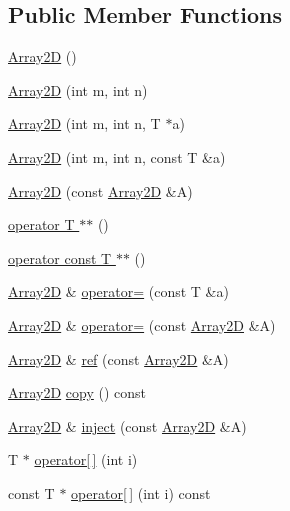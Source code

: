 \subsection*{Public Member Functions}
\begin{DoxyCompactItemize}
\item 
\hyperlink{classTNT_1_1Array2D_ab01d5e4b88c04d9e4906e7ea069f9dc0}{Array2\-D} ()
\item 
\hyperlink{classTNT_1_1Array2D_a80990fd85f6c04956a247d43d23a6af4}{Array2\-D} (int m, int n)
\item 
\hyperlink{classTNT_1_1Array2D_a7447ecfb709ce78db3c78ff21104f6f2}{Array2\-D} (int m, int n, T $\ast$a)
\item 
\hyperlink{classTNT_1_1Array2D_a0bbed4288ef81ee0c9baabf69c824191}{Array2\-D} (int m, int n, const T \&a)
\item 
\hyperlink{classTNT_1_1Array2D_a065e795f6f2486ca7ea0bca09200dbd4}{Array2\-D} (const \hyperlink{classTNT_1_1Array2D}{Array2\-D} \&A)
\item 
\hyperlink{classTNT_1_1Array2D_a4049d0d72eddf918ec9a84f799b92e47}{operator T $\ast$$\ast$} ()
\item 
\hyperlink{classTNT_1_1Array2D_a38bf24494047929cb39c89b5c9c516f7}{operator const T $\ast$$\ast$} ()
\item 
\hyperlink{classTNT_1_1Array2D}{Array2\-D} \& \hyperlink{classTNT_1_1Array2D_af14c53b4b3977ab8ecb34da61e5a6e4c}{operator=} (const T \&a)
\item 
\hyperlink{classTNT_1_1Array2D}{Array2\-D} \& \hyperlink{classTNT_1_1Array2D_a291213171560381b270246be0bbe75c0}{operator=} (const \hyperlink{classTNT_1_1Array2D}{Array2\-D} \&A)
\item 
\hyperlink{classTNT_1_1Array2D}{Array2\-D} \& \hyperlink{classTNT_1_1Array2D_a45629cdcb71db56e68c61721ebd6e1cf}{ref} (const \hyperlink{classTNT_1_1Array2D}{Array2\-D} \&A)
\item 
\hyperlink{classTNT_1_1Array2D}{Array2\-D} \hyperlink{classTNT_1_1Array2D_a475f33af47a33135fde05d1e01fdf0c3}{copy} () const 
\item 
\hyperlink{classTNT_1_1Array2D}{Array2\-D} \& \hyperlink{classTNT_1_1Array2D_a24f86f6bf4fd6436946c82e55a12af24}{inject} (const \hyperlink{classTNT_1_1Array2D}{Array2\-D} \&A)
\item 
T $\ast$ \hyperlink{classTNT_1_1Array2D_a472e0ff84ff7767033dc847a7a9c34cd}{operator\mbox{[}$\,$\mbox{]}} (int i)
\item 
const T $\ast$ \hyperlink{classTNT_1_1Array2D_a780cb44fafeec22f9ec591062e370ae1}{operator\mbox{[}$\,$\mbox{]}} (int i) const 

\end{DoxyCompactItemize}
